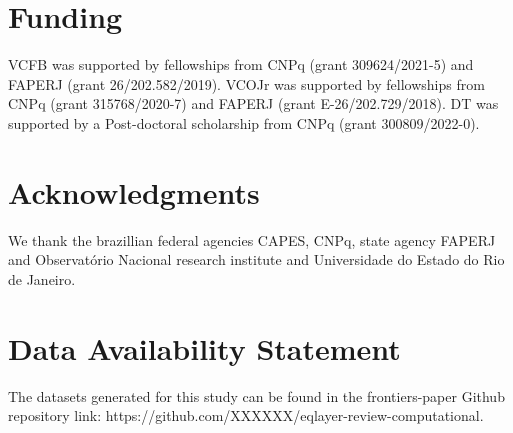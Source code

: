\documentclass[utf8]{FrontiersinHarvard} %
\begin{document}
\section*{Funding}
VCFB was supported by fellowships from CNPq (grant 309624/2021-5) and FAPERJ (grant 26/202.582/2019). 
VCOJr was supported by fellowships from CNPq (grant 315768/2020-7) and FAPERJ (grant E-26/202.729/2018).
DT was supported by a Post-doctoral scholarship from CNPq (grant 300809/2022-0).

\section*{Acknowledgments}
We thank the brazillian federal agencies CAPES, CNPq, state agency FAPERJ and Observatório Nacional research institute and Universidade do Estado do Rio de Janeiro.

\section*{Data Availability Statement}
The datasets generated for this study can be found in the frontiers-paper Github repository link: https://github.com/XXXXXX/eqlayer-review-computational.









\end{document}
